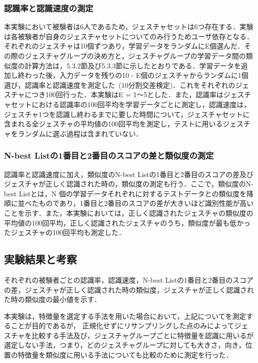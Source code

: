 \subsubsection{認識率と認識速度の測定}
本実験において被験者は6人であるため，ジェスチャセットは6つ存在する．実験は各被験者が自身のジェスチャセットについてのみ行うためユーザ依存となる．それぞれのジェスチャは10個ずつあり，学習データをランダムにE個選んだ．その際のジェスチャグループの決め方と，ジェスチャグループの学習データ間の類似度の計算方法は，5.3.2節及び5.3.3節に示したとおりである．学習データを追加し終わった後，入力データを残りの10 - E個のジェスチャからランダムに1個選び，認識率と認識速度を測定した~(10分割交差検定)．これをそれぞれのジェスチャにつき100回行った．本実験はE = 1〜5とした．また，認識率はジェスチャセットにおける認識率の100回平均を学習データごとに測定し，認識速度は，ジェスチャ1つを認識し終わるまでに要した時間について，ジェスチャセットに含まれる全ジェスチャの平均値の100回平均を測定し，テストに用いるジェスチャをランダムに選ぶ過程は含まれていない．

\subsubsection{N-best Listの1番目と2番目のスコアの差と類似度の測定}
認識率と認識速度に加え，類似度のN-best Listの1番目と2番目のスコアの差及びジェスチャが正しく認識された時の，類似度の測定も行う．ここで，類似度のN-best Listとは，N 個の学習データそれぞれに対するテストデータとの類似度を降順に並べたものであり，1番目と2番目のスコアの差が大きいほど識別性能が高いことを示す．また，本実験においては，正しく認識されたジェスチャの類似度の平均値の100回平均，正しく認識されたジェスチャのうち，類似度が最も低かったジェスチャの100回平均も測定した．


\subsection{実験結果と考察}
それぞれの被験者ごとの認識率，認識速度，N-best Listの1番目と2番目のスコアの差，ジェスチャが正しく認識された時の類似度，ジェスチャが正しく認識された時の類似度の最小値を示す．

本実験は，特徴量を選定する手法を用いた場合において，上記についてを測定することが目的であるが，
正規化せずにリサンプリングした点のみによってジェスチャを比較する手法及び，ジェスチャグループごとに特徴量を認識に用いるが選定しない手法，つまり，どのジェスチャグループに対しても大きさ，向き，位置の特徴量を類似度に用いる手法についても比較のために測定を行った．

